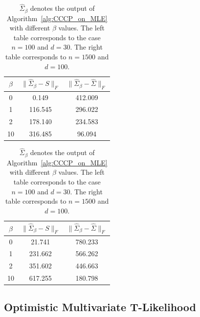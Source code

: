 \documentclass[sn-nature]{sn-jnl}%
\theoremstyle{thmstyleone}%
\theoremstyle{thmstyletwo}%
\theoremstyle{thmstylethree}%
\begin{document}
\begin{table}[htbp]
  \centering
  \begin{minipage}{0.45\textwidth}
    \centering
    \begin{tabular}{|c|c|c|}
    \hline
    $\beta$ & $\|\hat{\Sigma}_\beta - S\|_F$ & $\|\hat{\Sigma}_\beta - \hat{\Sigma}\|_F$ \\ \hline
    0  & 0.149   & 412.009 \\ \hline
    1  & 116.545 & 296.022 \\ \hline
    2  & 178.140 & 234.583 \\ \hline
    10 & 316.485 & 96.094  \\ \hline
    \end{tabular}
  \end{minipage}
  \begin{minipage}{0.45\textwidth}
    \centering
    \begin{tabular}{|c|c|c|}
    \hline
    $\beta$ & $\|\hat{\Sigma}_\beta - S\|_F$ & $\|\hat{\Sigma}_\beta - \hat{\Sigma}\|_F$ \\ \hline
    0  & 21.741  & 780.233 \\ \hline
    1  & 231.662 & 566.262 \\ \hline
    2  & 351.602 & 446.663 \\ \hline
    10 & 617.255 & 180.798 \\ \hline
    \end{tabular}
  \end{minipage}
  \caption{$\hat{\Sigma}_\beta$ denotes the output of Algorithm~\ref{alg:CCCP_on_MLE} with different $\beta$ values. The left table corresponds to the case $n=100$ and $d =30$. The right table corresponds to $n=1500$ and $d=100$.}
  \label{table:gaussian_aux_norm_master}
\end{table}


\subsection{Optimistic Multivariate T-Likelihood}
\end{document}
